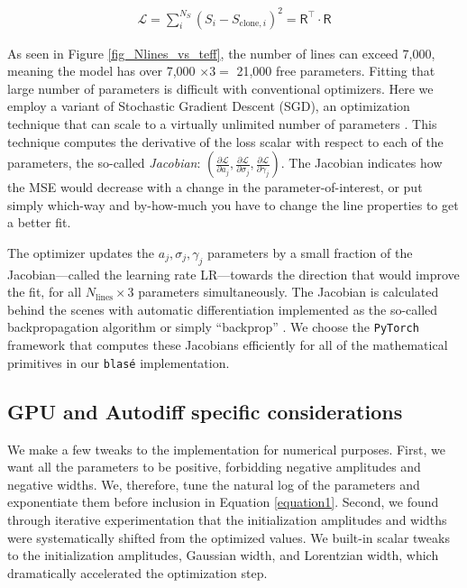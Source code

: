 \documentclass[modern]{aastex631}
\begin{document}
\begin{eqnarray}
    \mathcal{L} = \sum_i^{N_S} (S_i - S_{\mathrm{clone},i})^2 = \mathsf{R^\intercal}\cdot \mathsf{R} \label{simpleLikelihood}
\end{eqnarray}


As seen in Figure \ref{fig_Nlines_vs_teff}, the number of lines can exceed 7,000, meaning the model has over 7,000 $\times 3 =$ 21,000 free parameters. Fitting that large number of parameters is difficult with conventional optimizers.  Here we employ a variant of Stochastic Gradient Descent (SGD), an optimization technique that can scale to a virtually unlimited number of parameters \citep{2016arXiv160904747R}. This technique computes the derivative of the loss scalar with respect to each of the parameters, the so-called \emph{Jacobian}: $(\frac{\partial \mathcal{L}}{\partial a_j}, \frac{\partial \mathcal{L}}{\partial \sigma_j}, \frac{\partial \mathcal{L}}{\partial \gamma_j})$. The Jacobian indicates how the MSE would decrease with a change in the parameter-of-interest, or put simply which-way and by-how-much you have to change the line properties to get a better fit.

The optimizer updates the $a_j, \sigma_j, \gamma_j$ parameters by a small fraction of the Jacobian---called the learning rate LR---towards the direction that would improve the fit, for all $N_{\mathrm{lines}} \times 3$ parameters simultaneously. The Jacobian is calculated behind the scenes with automatic differentiation implemented as the so-called backpropagation algorithm or simply ``backprop'' \citep{2015arXiv150205767G}. We choose the \texttt{PyTorch} framework that computes these Jacobians efficiently for all of the mathematical primitives in our \texttt{blas\'e} implementation.


\subsection{GPU and Autodiff specific considerations}
We make a few tweaks to the implementation for numerical purposes. First, we want all the parameters to be positive, forbidding negative amplitudes and negative widths. We, therefore, tune the natural log of the parameters and exponentiate them before inclusion in Equation \ref{equation1}. Second, we found through iterative experimentation that the initialization amplitudes and widths were systematically shifted from the optimized values. We built-in scalar tweaks to the initialization amplitudes, Gaussian width, and Lorentzian width, which dramatically accelerated the optimization step.
\end{document}
